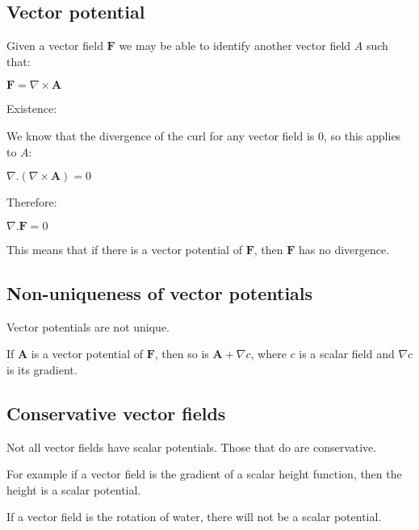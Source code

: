 
\subsection{Vector potential}

Given a vector field \(\mathbf F\) we may be able to identify another vector field \(A\) such that:

\(\mathbf F =\nabla \times \mathbf A\)

Existence:

We know that the divergence of the curl for any vector field is \(0\), so this applies to \(A\):

\(\nabla . (\nabla \times \mathbf A)=0\)

Therefore:

\(\nabla . \mathbf F= 0\)

This means that if there is a vector potential of \(\mathbf F\), then \(\mathbf F\) has no divergence.

\subsection{Non-uniqueness of vector potentials}

Vector potentials are not unique.

If \(\mathbf A\) is a vector potential of \(\mathbf F\), then so is \(\mathbf A + \nabla c\), where \(c\) is a scalar field and \(\nabla c\) is its gradient.

\subsection{Conservative vector fields}

Not all vector fields have scalar potentials. Those that do are conservative.

For example if a vector field is the gradient of a scalar height function, then the height is a scalar potential.

If a vector field is the rotation of water, there will not be a scalar potential.

